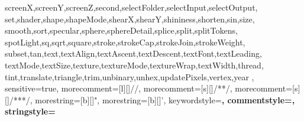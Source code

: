 {{        screenX,screenY,screenZ,second,selectFolder,selectInput,selectOutput,
        set,shader,shape,shapeMode,shearX,shearY,shininess,shorten,sin,size,
        smooth,sort,specular,sphere,sphereDetail,splice,split,splitTokens,
        spotLight,sq,sqrt,square,stroke,strokeCap,strokeJoin,strokeWeight,
        subset,tan,text,textAlign,textAscent,textDescent,textFont,textLeading,
        textMode,textSize,texture,textureMode,textureWrap,textWidth,thread,
        tint,translate,triangle,trim,unbinary,unhex,updatePixels,vertex,year
    },
    sensitive=true,
    morecomment=[l][\color{processinggray}]{//},
    morecomment=[s][\color{processinggray}]{/*}{*/},
    morecomment=[s][\color{processinggray}]{/**}{*/},
    morestring=[b][\color{purple}]",
    morestring=[b][\color{purple}]',
    keywordstyle=\color{function}\bfseries,
    commentstyle=\color{processinggray},
    stringstyle=\color{purple}
}

